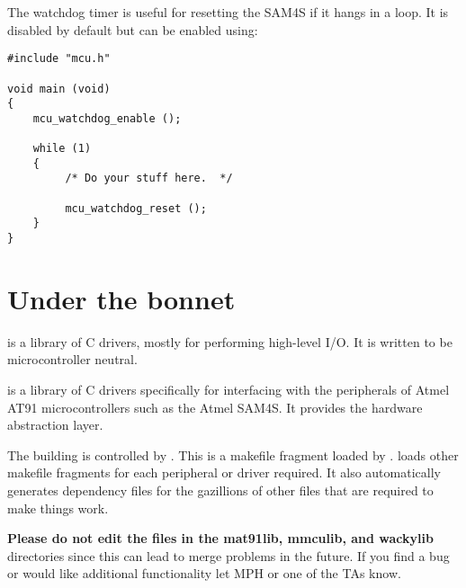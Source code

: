 The watchdog timer is useful for resetting the SAM4S if it hangs in a
loop.  It is disabled by default but can be enabled using:
%
\begin{verbatim}
#include "mcu.h"

void main (void)
{
    mcu_watchdog_enable ();
   
    while (1)
    {
         /* Do your stuff here.  */

         mcu_watchdog_reset ();
    }
}
\end{verbatim}

\section{Under the bonnet}
\label{under-the-bonnet}

 is a library of C drivers, mostly for performing high-level I/O.
It is written to be microcontroller neutral.

 is a library of C drivers specifically for interfacing
with the peripherals of Atmel AT91 microcontrollers such as the Atmel
SAM4S. It provides the hardware abstraction layer.

The building is controlled by . This is a
makefile fragment loaded by .
 loads other makefile fragments for each peripheral or driver required. It also automatically generates
dependency files for the gazillions of other files that are required
to make things work.


\textbf{Please do not edit the files in the mat91lib, mmculib, and
wackylib} directories since this can lead to merge problems in the
future. If you find a bug or would like additional functionality let MPH
or one of the TAs know.
